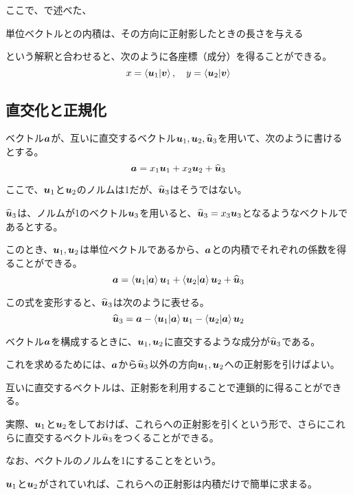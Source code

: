 \documentclass[../../../topic_linear-algebra]{subfiles}
\begin{document}
ここで、で述べた、
\begin{emphabox}
  \begin{spacebox}
    \begin{center}
      単位ベクトルとの内積は、その方向に正射影したときの長さを与える
    \end{center}
  \end{spacebox}
\end{emphabox}
という解釈と合わせると、次のように各座標（成分）を得ることができる。
\begin{equation*}
  x = \braket{\vb*{u}_1|\vb*{v}}, \quad y = \braket{\vb*{u}_2|\vb*{v}}
\end{equation*}

\subsection{直交化と正規化}

ベクトル$\vb*{a}$が、互いに直交するベクトル$\vb*{u}_1, \vb*{u}_2, \widehat{\vb*{u}}_3$を用いて、次のように書けるとする。
\begin{equation*}
  \vb*{a} = x_1\vb*{u}_1 + x_2\vb*{u}_2 + \widehat{\vb*{u}}_3
\end{equation*}

ここで、$\vb*{u}_1$と$\vb*{u}_2$のノルムは1だが、$\widehat{\vb*{u}}_3$はそうではない。

$\widehat{\vb*{u}}_3$は、ノルムが1のベクトル$\vb*{u}_3$を用いると、$\widehat{\vb*{u}}_3 = x_3 \vb*{u}_3$となるようなベクトルであるとする。

\br

このとき、$\vb*{u}_1, \vb*{u}_2$は単位ベクトルであるから、$\vb*{a}$との内積でそれぞれの係数を得ることができる。
\begin{equation*}
  \vb*{a} = \braket{\vb*{u}_1|\vb*{a}} \vb*{u}_1 + \braket{\vb*{u}_2|\vb*{a}} \vb*{u}_2 + \widehat{\vb*{u}}_3
\end{equation*}

この式を変形すると、$\widehat{\vb*{u}}_3$は次のように表せる。
\begin{equation*}
  \widehat{\vb*{u}}_3 = \vb*{a} - \braket{\vb*{u}_1|\vb*{a}} \vb*{u}_1 - \braket{\vb*{u}_2|\vb*{a}} \vb*{u}_2
\end{equation*}

ベクトル$\vb*{a}$を構成するときに、$\vb*{u}_1,\vb*{u}_2$に直交するような成分が$\widehat{\vb*{u}}_3$である。

これを求めるためには、$\vb*{a}$から$\widehat{\vb*{u}}_3$以外の方向$\vb*{u}_1,\vb*{u}_2$への正射影を引けばよい。

\br

互いに直交するベクトルは、正射影を利用することで連鎖的に得ることができる。

実際、$\vb*{u}_1$と$\vb*{u}_2$をしておけば、これらへの正射影を引くという形で、さらにこれらに直交するベクトル$\widehat{\vb*{u}}_3$をつくることができる。

\br

なお、ベクトルのノルムを1にすることをという。

$\vb*{u}_1$と$\vb*{u}_2$がされていれば、これらへの正射影は内積だけで簡単に求まる。
\end{document}

